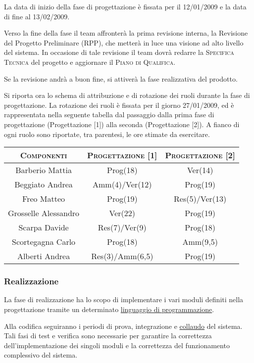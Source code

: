 \documentclass[11pt,a4paper]{article}
\begin{document}
La data di inizio della fase di progettazione è fissata per il 12/01/2009 e la data di fine al 13/02/2009.

Verso la fine della fase il team affronterà la prima revisione interna, la Revisione del Progetto Preliminare (RPP), che metterà in luce una visione ad alto livello del sistema.
In occasione di tale revisione il team dovrà redarre la \textsc{Specifica Tecnica} del progetto e aggiornare il \textsc{Piano di Qualifica}.

Se la revisione andrà a buon fine, si attiverà la fase realizzativa del prodotto.



Si riporta ora lo schema di attribuzione e di rotazione dei ruoli durante la fase di progettazione.
La rotazione dei ruoli è fissata per il giorno 27/01/2009, ed è rappresentata nella seguente tabella dal passaggio dalla prima fase di progettazione (Progettazione [1]) alla seconda (Progettazione [2]).
A fianco di ogni ruolo sono riportate, tra parentesi, le ore stimate da esercitare.
\\
\begin{center}
\begin{tabular}{|c||c|c|}
\hline
\textsc{Componenti} & \textsc{Progettazione [1]} & \textsc{Progettazione [2]} \\ \hline \hline
Barberio Mattia & Prog(18) & Ver(14) \\ \hline
Beggiato Andrea & Amm(4)/Ver(12) & Prog(19) \\ \hline
Freo Matteo & Prog(19) & Res(5)/Ver(13) \\ \hline
Grosselle Alessandro & Ver(22) & Prog(19) \\ \hline
Scarpa Davide & Res(7)/Ver(9) & Prog(18) \\ \hline
Scortegagna Carlo & Prog(18) & Amm(9,5) \\ \hline
Alberti Andrea & Res(3)/Amm(6,5) & Prog(19) \\ \hline
\end{tabular}
\end{center}
\bigskip
\subsubsection{Realizzazione}
La fase di realizzazione ha lo scopo di implementare i vari moduli definiti nella progettazione tramite un determinato \underline{linguaggio di programmazione}.

Alla codifica seguiranno i periodi di prova, integrazione e \underline{collaudo} del sistema.
Tali fasi di test e verifica sono necessarie per garantire la correttezza dell'implementazione dei singoli moduli e la correttezza del funzionamento complessivo del sistema.
\end{document}
